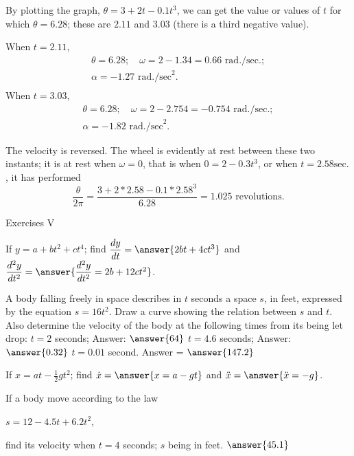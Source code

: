 \documentclass{ximera}
\begin{document}
By plotting the graph, $\theta = 3 + 2t - 0.1t^3$, we can get
the value or values of $t$ for which $\theta = 6.28$; these
are $2.11$ and $3.03$ (there is a third negative value).


When $t = 2.11$,
\begin{gather*}
\theta = 6.28;\quad\omega = 2 - 1.34 = 0.66 \text{ rad./sec.}; \\
\alpha = -1.27 \text{ rad./sec}^2. \\
\end{gather*}
When $t = 3.03$,
\begin{gather*}
\theta = 6.28;\quad \omega = 2 - 2.754 = -0.754 \text{ rad./sec.}; \\
\alpha = -1.82 \text{ rad./sec}^2.
\end{gather*}

The velocity is reversed. The wheel is evidently
at rest between these two instants; it is at rest when
$\omega = 0$, that is when $0 = 2 - 0.3t^3$, or when $t = 2.58 \text{sec.}$,
it has performed
\[
\frac{\theta}{2\pi}
  = \frac{3 + 2 * 2.58 - 0.1 * 2.58^3}{6.28} = 1.025 \text{ revolutions}.
\]


{\Large Exercises V\par}



\begin{problem}
If $y = a + bt^2 + ct^4$; find $\dfrac{dy}{dt} = \answer{2bt + 4ct^3}$ and $\dfrac{d^2y}{dt^2} = \answer{\dfrac{d^2y}{dt^2} = 2b + 12ct^2}$.
\end{problem}

\begin{problem}
A body falling freely in space describes in $t$ seconds
a space $s$, in feet, expressed by the equation
$s = 16t^2$. Draw a curve showing the relation between
$s$ and $t$. Also determine the velocity of the body at
the following times from its being let drop:
$t = 2$ seconds; Answer: $\answer{64}$
$t = 4.6$ seconds; Answer: $\answer{0.32}$
$t = 0.01$ second. Answer = $\answer{147.2}$
\end{problem}



\begin{problem}
 If $x = at - \frac{1}{2}gt^2$; find $\dot{x} = \answer{x = a - gt}$ and $\ddot{x} = \answer{\ddot{x} = -g}$.
 \end{problem}

\begin{problem}
If a body move according to the law

$s = 12 - 4.5t + 6.2t^2$,

find its velocity when $t = 4$ seconds; $s$ being in feet. $\answer{45.1}$
\end{problem}
\end{document}
